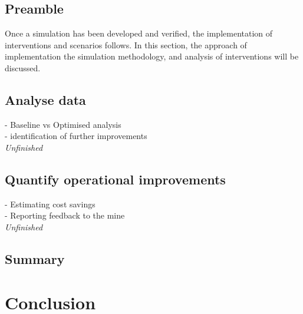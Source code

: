 	\subsection{Preamble}
		Once a simulation has been developed and verified, the implementation of interventions and scenarios follows. In this section, the approach of implementation the simulation methodology, and analysis of interventions will be discussed.
	\subsection{Analyse data}
		- Baseline vs Optimised analysis \\
		- identification of further improvements\\
		\textit{Unfinished}
	
	\subsection{Quantify operational improvements}
		- Estimating cost savings \\
		- Reporting feedback to the mine\\
		\textit{Unfinished}
	\subsection{Summary}
\section{Conclusion}
